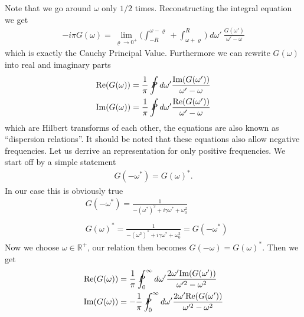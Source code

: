 \documentclass[a4paper]{article}
\begin{document}
Note that we go around $\omega$ only $1/2$ times. Reconstructing the integral
equation we get
\begin{align}
    -i\pi G(\omega) = \lim_{\varrho \rightarrow 0^+}
    \big(
     \int_{-R}^{\omega -\varrho} + \int_{\omega +\varrho}^R
    \big) \;d\omega'\ \frac{G(\omega')}{\omega' - \omega}
\end{align}
which is exactly the Cauchy Principal Value. Furthermore we can rewrite
$G(\omega)$ into real and imaginary parts
\begin{align}
    \text{Re} (G(\omega)) = \frac{1}{\pi} \PV  d\omega' \frac{\text{Im}
    (G(\omega'))}{\omega' - \omega}\\
    \text{Im} (G(\omega)) = \frac{1}{\pi} \PV  d\omega' \frac{\text{Re}
    (G(\omega'))}{\omega' - \omega}\\
\end{align}
which are Hilbert transforms of each other, the equations are also known
as ``dispersion relations''. It should be noted that these equations also allow
negative frequencies. Let us derrive an representation for only positive
frequencies. We start off by a simple statement
\begin{align}
    G(-\omega^*) = G(\omega)^*.
\end{align}
In our case this is obviously true
\begin{align}
    &G(-\omega^*) = \frac{1}{-(\omega^*)^2 + i\gamma \omega^* + \omega_0^2}\\
    \nonumber \\
    &G(\omega)^* = \frac{1}{-(\omega^2)^* + i\gamma \omega^* + \omega_0^2} =
    G(-\omega^*)
\end{align}
Now we choose $\omega \in \mathbb{R}^+$, our relation then becomes
$G(-\omega) = G(\omega)^*$. Then we get
\begin{align}
    \text{Re} (G(\omega)) &= \frac{1}{\pi} \PV_0^\infty  d\omega' \frac{2\omega'\text{Im}
    (G(\omega'))}{\omega'^2 - \omega^2}\\
    \text{Im} (G(\omega)) &= -\frac{1}{\pi} \PV_0^\infty  d\omega' \frac{2\omega'\text{Re}
    (G(\omega'))}{\omega'^2 - \omega^2}
\end{align}
\end{document}
